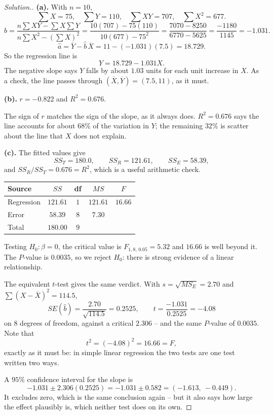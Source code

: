 \documentclass[11pt,a4paper]{article}
\theoremstyle{definition}
\newenvironment{solution}
  {\renewcommand{\qedsymbol}{}\begin{proof}[\textit{Solution}.]}
  {\end{proof}}
\begin{document}
\begin{solution}
\textbf{(a).} With $n=10$,
\[\sum X=75,\quad \sum Y=110,\quad \sum XY=707,\quad \sum X^2=677.\]
\[\hat{b}=\frac{n\sum XY-\sum X\sum Y}{n\sum X^2-\left(\sum X\right)^2}
=\frac{10(707)-75(110)}{10(677)-75^2}=\frac{7070-8250}{6770-5625}
=\frac{-1180}{1145}=-1.031.\]
\[\hat{a}=\overline{Y}-\hat{b}\,\overline{X}=11-(-1.031)(7.5)=18.729.\]
So the regression line is
\[Y=18.729-1.031X.\]
The negative slope says $Y$ falls by about $1.03$ units for each unit increase in $X$. As a
check, the line passes through $(\overline{X},\overline{Y})=(7.5,11)$, as it must.

\textbf{(b).} $r=-0.822$ and $R^2=0.676$.

The sign of $r$ matches the sign of the slope, as it always does. $R^2=0.676$ says the line
accounts for about $68\%$ of the variation in $Y$; the remaining $32\%$ is scatter about
the line that $X$ does not explain.

\textbf{(c).} The fitted values give
\[SS_T=180.0,\qquad SS_R=121.61,\qquad SS_E=58.39,\]
and $SS_R/SS_T=0.676=R^2$, which is a useful arithmetic check.
\begin{table}[H]
\centering
\begin{tabular}{lcccc}
Source & $SS$ & df & $MS$ & $F$\\
\hline
Regression & $121.61$ & $1$ & $121.61$ & $16.66$\\
Error      & $58.39$  & $8$ & $7.30$   & \\
\hline
Total      & $180.00$ & $9$ & & \\
\end{tabular}
\end{table}
Testing $H_0:\beta=0$, the critical value is $F_{1,8,\,0.05}=5.32$ and $16.66$ is well
beyond it. The $P$-value is $0.0035$, so we reject $H_0$: there is strong evidence of a
linear relationship.

The equivalent $t$-test gives the same verdict. With
$s=\sqrt{MS_E}=2.70$ and $\sum(X-\overline{X})^2=114.5$,
\[SE(\hat{b})=\frac{2.70}{\sqrt{114.5}}=0.2525,
\qquad t=\frac{-1.031}{0.2525}=-4.08\]
on $8$ degrees of freedom, against a critical $2.306$ -- and the same $P$-value of
$0.0035$. Note that
\[t^2=(-4.08)^2=16.66=F,\]
exactly as it must be: in simple linear regression the two tests are one test written two
ways.

A $95\%$ confidence interval for the slope is
\[-1.031\pm 2.306(0.2525)=-1.031\pm 0.582=(-1.613,\ -0.449).\]
It excludes zero, which is the same conclusion again -- but it also says how large the
effect plausibly is, which neither test does on its own.
\end{solution}
\end{document}
